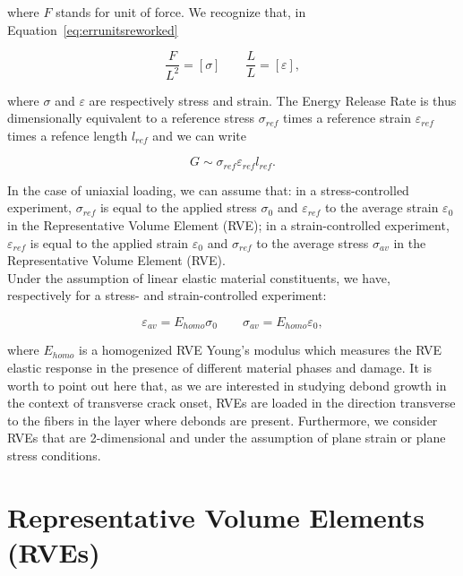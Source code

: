 \documentclass[a4paper,fleqn]{cas-dc}
\begin{document}
where $F$ stands for unit of force. We recognize that, in Equation~\ref{eq:errunitsreworked}

\begin{equation}\label{eq:sigmaepsunits}
\frac{F}{L^{2}}=\left[\sigma\right]\qquad\frac{L}{L}=\left[\varepsilon\right],
\end{equation}

where $\sigma$ and $\varepsilon$ are respectively stress and strain. The Energy Release Rate is thus dimensionally equivalent to a reference stress $\sigma_{ref}$ times a reference strain $\varepsilon_{ref}$ times a refence length $l_{ref}$ and we can write

\begin{equation}\label{eq:G}
G\sim\sigma_{ref}\varepsilon_{ref}l_{ref}.
\end{equation}

In the case of uniaxial loading, we can assume that: in a stress-controlled experiment, $\sigma_{ref}$ is equal to the applied stress $\sigma_{0}$ and $\varepsilon_{ref}$ to the average strain $\varepsilon_{0}$ in the Representative Volume Element (RVE); in a strain-controlled experiment, $\varepsilon_{ref}$ is equal to the applied strain $\varepsilon_{0}$ and $\sigma_{ref}$ to the average stress $\sigma_{av}$ in the Representative Volume Element (RVE).\\
Under the assumption of linear elastic material constituents, we have, respectively for a stress- and strain-controlled experiment:

\begin{equation}\label{eq:elasticresponse}
\varepsilon_{av}=E_{homo}\sigma_{0}\qquad\sigma_{av}=E_{homo}\varepsilon_{0},
\end{equation}

where $E_{homo}$ is a homogenized RVE Young's modulus which measures the RVE elastic response in the presence of different material phases and damage. It is worth to point out here that, as we are interested in studying debond growth in the context of transverse crack onset, RVEs are loaded in the direction transverse to the fibers in the layer where debonds are present. Furthermore, we consider RVEs that are 2-dimensional and under the assumption of plane strain or plane stress conditions.  

\section{Representative Volume Elements (RVEs)}
\end{document}
